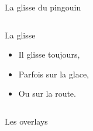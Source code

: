 \documentclass[10pt,a4paper]{beamer}
\begin{document}
\begin{frame}{La glisse du pingouin}
\begin{columns}[c]
        \begin{block}{La glisse}
          \begin{itemize}
          \item<1-3> Il glisse toujours,          
          \item<2> Parfois sur la glace,          
          \item<3> Ou sur la route.
          \end{itemize}
       \end{block}
  \end{columns}
  \transdissolve
\end{frame}

\begin{frame}{Les overlays}
\transboxout
  \begin{columns}[t]
\end{columns}
\end{frame}
\end{document}

